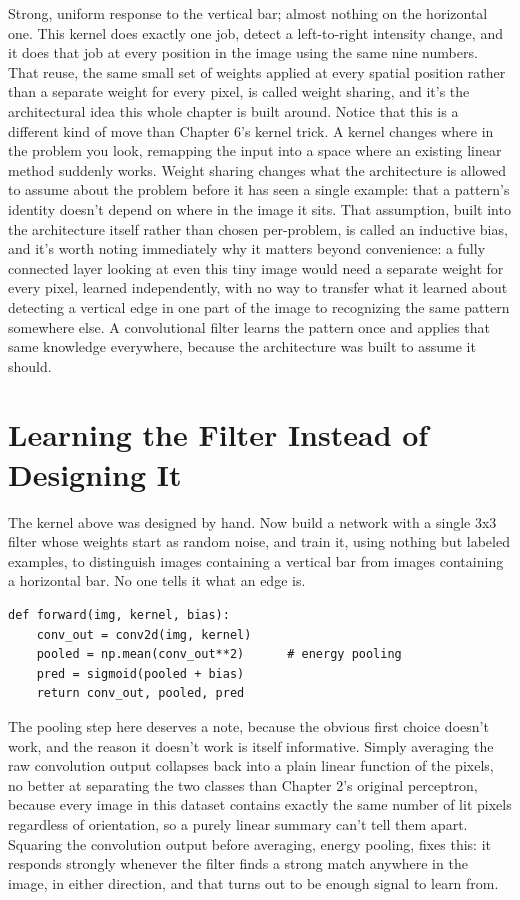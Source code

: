 Strong, uniform response to the vertical bar; almost nothing on the horizontal one. This kernel does exactly one job, detect a left-to-right intensity change, and it does that job at every position in the image using the same nine numbers. That reuse, the same small set of weights applied at every spatial position rather than a separate weight for every pixel, is called weight sharing, and it's the architectural idea this whole chapter is built around. Notice that this is a different kind of move than Chapter 6's kernel trick. A kernel changes where in the problem you look, remapping the input into a space where an existing linear method suddenly works. Weight sharing changes what the architecture is allowed to assume about the problem before it has seen a single example: that a pattern's identity doesn't depend on where in the image it sits. That assumption, built into the architecture itself rather than chosen per-problem, is called an inductive bias, and it's worth noting immediately why it matters beyond convenience: a fully connected layer looking at even this tiny image would need a separate weight for every pixel, learned independently, with no way to transfer what it learned about detecting a vertical edge in one part of the image to recognizing the same pattern somewhere else. A convolutional filter learns the pattern once and applies that same knowledge everywhere, because the architecture was built to assume it should.

\section*{Learning the Filter Instead of Designing It}

The kernel above was designed by hand. Now build a network with a single 3x3 filter whose weights start as random noise, and train it, using nothing but labeled examples, to distinguish images containing a vertical bar from images containing a horizontal bar. No one tells it what an edge is.

\begin{Verbatim}[fontsize=\small, frame=single, xleftmargin=1em, xrightmargin=1em]
def forward(img, kernel, bias):
    conv_out = conv2d(img, kernel)
    pooled = np.mean(conv_out**2)      # energy pooling
    pred = sigmoid(pooled + bias)
    return conv_out, pooled, pred
\end{Verbatim}

The pooling step here deserves a note, because the obvious first choice doesn't work, and the reason it doesn't work is itself informative. Simply averaging the raw convolution output collapses back into a plain linear function of the pixels, no better at separating the two classes than Chapter 2's original perceptron, because every image in this dataset contains exactly the same number of lit pixels regardless of orientation, so a purely linear summary can't tell them apart. Squaring the convolution output before averaging, energy pooling, fixes this: it responds strongly whenever the filter finds a strong match anywhere in the image, in either direction, and that turns out to be enough signal to learn from.

